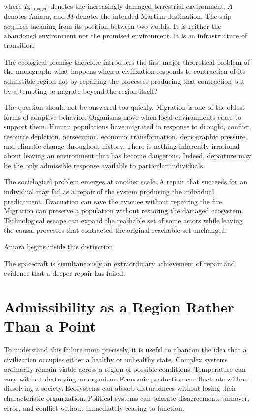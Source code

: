 \documentclass[11pt,oneside]{book}
\theoremstyle{definition}
\theoremstyle{remark}
\begin{document}
where \(E_{\mathrm{damaged}}\) denotes the increasingly damaged terrestrial environment, \(A\) denotes Aniara, and \(M\) denotes the intended Martian destination. The ship acquires meaning from its position between two worlds. It is neither the abandoned environment nor the promised environment. It is an infrastructure of transition.

The ecological premise therefore introduces the first major theoretical problem of the monograph: what happens when a civilization responds to contraction of its admissible region not by repairing the processes producing that contraction but by attempting to migrate beyond the region itself?

The question should not be answered too quickly. Migration is one of the oldest forms of adaptive behavior. Organisms move when local environments cease to support them. Human populations have migrated in response to drought, conflict, resource depletion, persecution, economic transformation, demographic pressure, and climatic change throughout history. There is nothing inherently irrational about leaving an environment that has become dangerous. Indeed, departure may be the only admissible response available to particular individuals.

The sociological problem emerges at another scale. A repair that succeeds for an individual may fail as a repair of the system producing the individual predicament. Evacuation can save the evacuee without repairing the fire. Migration can preserve a population without restoring the damaged ecosystem. Technological escape can expand the reachable set of some actors while leaving the causal processes that contracted the original reachable set unchanged.

Aniara begins inside this distinction.

The spacecraft is simultaneously an extraordinary achievement of repair and evidence that a deeper repair has failed.

\section{Admissibility as a Region Rather Than a Point}

To understand this failure more precisely, it is useful to abandon the idea that a civilization occupies either a healthy or unhealthy state. Complex systems ordinarily remain viable across a region of possible conditions. Temperature can vary without destroying an organism. Economic production can fluctuate without dissolving a society. Ecosystems can absorb disturbances without losing their characteristic organization. Political systems can tolerate disagreement, turnover, error, and conflict without immediately ceasing to function.
\end{document}
